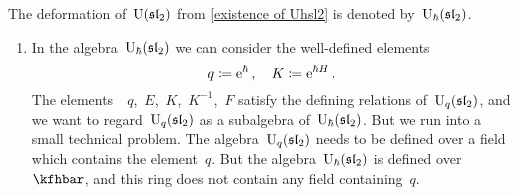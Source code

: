 \documentclass[a4paper, 11pt, oneside]{scrartcl}
\begin{document}
\begin{definition}
  The deformation of~$\operatorname{U}(\mathfrak{sl}_2)$ from \cref{existence of Uhsl2} is denoted by~$\operatorname{U}_{\hbar}(\mathfrak{sl}_2)$.
\end{definition}

\begin{remark}
  \leavevmode
  \begin{enumerate}
    \item
      In the algebra~$\operatorname{U}_{\hbar}(\mathfrak{sl}_2)$ we can consider the well-defined elements
      \[
        q \coloneqq \mathrm{e}^{\hbar} \,,
        \quad
        K \coloneqq \mathrm{e}^{\hbar H} \,.
      \]
      The elements~~$q$,~$E$,~$K$,~$K^{-1}$,~$F$ satisfy the defining relations of~$\operatorname{U}_q(\mathfrak{sl}_2)$, and we want to regard~$\operatorname{U}_q(\mathfrak{sl}_2)$ as a subalgebra of~$\operatorname{U}_{\hbar}(\mathfrak{sl}_2)$.
      But we run into a small technical problem.
      The algebra~$\operatorname{U}_q(\mathfrak{sl}_2)$ needs to be defined over a field which contains the element~$q$.
      But the algebra~$\operatorname{U}_{\hbar}(\mathfrak{sl}_2)$ is defined over~$\kfhbar$, and this ring does not contain any field containing~$q$.


\end{enumerate}
\end{remark}
\end{document}
